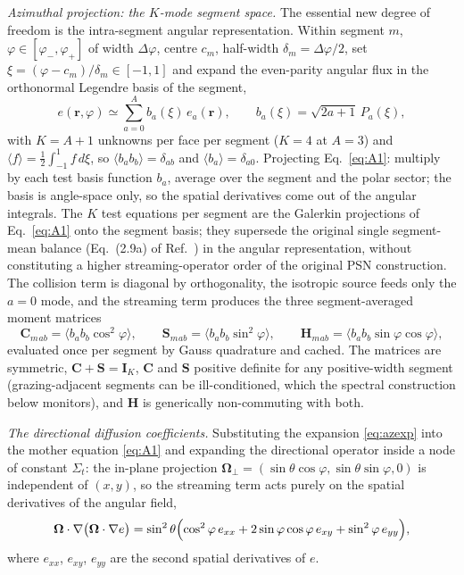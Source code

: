 \documentclass[11pt,a4paper]{article}
\begin{document}
\emph{Azimuthal projection: the $K$-mode segment space.}
The essential new degree of freedom is the intra-segment angular
representation. Within segment $m$, $\varphi\in[\varphi_-,\varphi_+]$
of width $\Delta\varphi$, centre $c_m$, half-width $\delta_m=\Delta\varphi/2$,
set $\xi=(\varphi-c_m)/\delta_m\in[-1,1]$ and expand the even-parity
angular flux in the orthonormal Legendre basis of the segment,
\begin{equation}
e(\mathbf{r},\varphi) \simeq \sum_{a=0}^{A} b_a(\xi)\,e_a(\mathbf{r}),
\qquad b_a(\xi)=\sqrt{2a+1}\,P_a(\xi),
\label{eq:azexp}
\end{equation}
with $K=A{+}1$ unknowns per face per segment ($K{=}4$ at $A{=}3$) and
$\langle f\rangle=\tfrac12\int_{-1}^{1}f\,d\xi$, so
$\langle b_a b_b\rangle=\delta_{ab}$ and $\langle b_a\rangle=\delta_{a0}$.
Projecting Eq.~\eqref{eq:A1}: multiply by each test basis function
$b_a$, average over the segment and the polar sector; the basis is
angle-space only, so the spatial derivatives come out of the angular
integrals. The $K$ test equations per segment are the Galerkin projections of
Eq.~\eqref{eq:A1} onto the segment basis; they supersede the original
single segment-mean balance (Eq.~(2.9a) of
Ref.~\cite{psn2027}) in the angular representation, without
constituting a higher streaming-operator order of the original PSN
construction.
The collision term is diagonal by orthogonality, the isotropic source
feeds only the $a{=}0$ mode, and the streaming term produces the three
segment-averaged moment matrices
\begin{equation}
\mathbf{C}_m{}_{ab} = \big\langle b_a b_b\cos^2\varphi\big\rangle,
\qquad
\mathbf{S}_m{}_{ab} = \big\langle b_a b_b\sin^2\varphi\big\rangle,
\qquad
\mathbf{H}_m{}_{ab} = \big\langle b_a b_b\sin\varphi\cos\varphi\big\rangle,
\label{eq:CSH}
\end{equation}
evaluated once per segment by Gauss quadrature and cached. The
matrices are symmetric, $\mathbf{C}+\mathbf{S}=\mathbf{I}_K$,
$\mathbf{C}$ and $\mathbf{S}$ positive definite for any positive-width
segment (grazing-adjacent segments can be ill-conditioned, which the
spectral construction below monitors), and $\mathbf{H}$ is generically
non-commuting with both.

\emph{The directional diffusion coefficients.}
Substituting the expansion \eqref{eq:azexp} into the mother equation
\eqref{eq:A1} and expanding the directional operator inside a node of
constant $\Sigma_t$: the in-plane projection
$\boldsymbol{\Omega}_\perp=(\sin\theta\cos\varphi,\sin\theta\sin\varphi,0)$
is independent of $(x,y)$, so the streaming term acts purely on the
spatial derivatives of the angular field,
\begin{equation}
\boldsymbol{\Omega}\cdot\nabla\bigl(\boldsymbol{\Omega}\cdot\nabla e\bigr)
=\sin^2\theta\Bigl(\cos^2\varphi\, e_{xx}
+2\sin\varphi\cos\varphi\, e_{xy}+\sin^2\varphi\, e_{yy}\Bigr),
\label{eq:stream}
\end{equation}
where $e_{xx}$, $e_{xy}$, $e_{yy}$ are the second spatial derivatives
of $e$.
\end{document}
